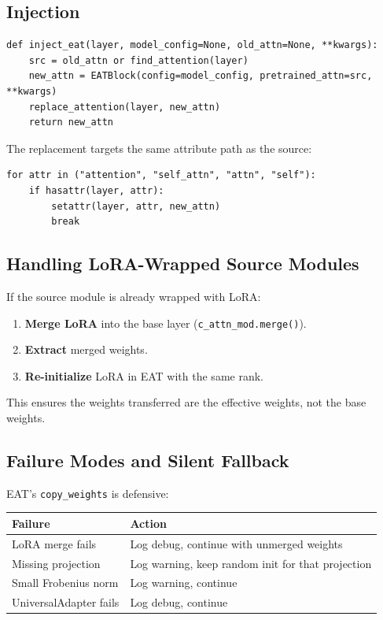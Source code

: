 \subsection{Injection}

\begin{lstlisting}
def inject_eat(layer, model_config=None, old_attn=None, **kwargs):
    src = old_attn or find_attention(layer)
    new_attn = EATBlock(config=model_config, pretrained_attn=src, **kwargs)
    replace_attention(layer, new_attn)
    return new_attn
\end{lstlisting}

The replacement targets the same attribute path as the source:

\begin{lstlisting}
for attr in ("attention", "self_attn", "attn", "self"):
    if hasattr(layer, attr):
        setattr(layer, attr, new_attn)
        break
\end{lstlisting}

\subsection{Handling LoRA-Wrapped Source Modules}

If the source module is already wrapped with LoRA:

\begin{enumerate}
\item \textbf{Merge LoRA} into the base layer (\texttt{c\_attn\_mod.merge()}).
\item \textbf{Extract} merged weights.
\item \textbf{Re-initialize} LoRA in EAT with the same rank.

\end{enumerate}
This ensures the weights transferred are the effective weights, not the 
base weights.

\subsection{Failure Modes and Silent Fallback}

EAT's \texttt{copy\_weights} is defensive:

\begin{table}[H]
\centering
\small
\begin{tabular}{ll}
\toprule
\textbf{Failure} & \textbf{Action} \\
\midrule
LoRA merge fails & Log debug, continue with unmerged weights \\
Missing projection & Log warning, keep random init for that projection \\
Small Frobenius norm & Log warning, continue \\
UniversalAdapter fails & Log debug, continue \\
\bottomrule
\end{tabular}
\end{table}

